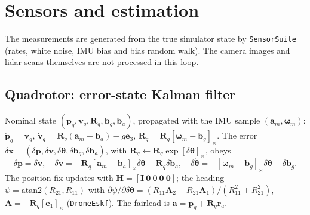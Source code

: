 \documentclass[11pt,a4paper]{article}
\newcommand{\hatm}[1]{[#1]_\times}
\newcommand{\e}{\bm{e}}
\begin{document}
\section{Sensors and estimation}\label{sec:est}
\begin{center}\end{center}
The measurements are generated from the true simulator state by \texttt{SensorSuite} (rates, white noise, IMU
bias and bias random walk). The camera images and lidar scans themselves are not processed in this loop.

\subsection{Quadrotor: error-state Kalman filter}
Nominal state $(\bm p_q,\bm v_q,\bm R_q,\bm b_g,\bm b_a)$, propagated with the IMU sample $(\bm a_m,\bm\omega_m)$:
$\dot{\bm p}_q=\bm v_q$, $\dot{\bm v}_q=\bm R_q(\bm a_m-\bm b_a)-g\e_3$, $\dot{\bm R}_q=\bm R_q\hatm{\bm\omega_m-\bm b_g}$. The error
$\delta\bm x=(\delta\bm p,\delta\bm v,\delta\bm\theta,\delta\bm b_g,\delta\bm b_a)$, with $\bm R_q\leftarrow\bm R_q\exp\hatm{\delta\bm\theta}$, obeys
\begin{equation}
 \delta\dot{\bm p}=\delta\bm v,\quad \delta\dot{\bm v}=-\bm R_q\hatm{\bm a_m-\bm b_a}\delta\bm\theta-\bm R_q\delta\bm b_a,\quad
 \delta\dot{\bm\theta}=-\hatm{\bm\omega_m-\bm b_g}\delta\bm\theta-\delta\bm b_g .
\end{equation}
The position fix updates with $\bm H=[\bm I\ \bm 0\ \bm 0\ \bm 0\ \bm 0]$; the heading
$\psi=\mathrm{atan2}(R_{21},R_{11})$ with $\partial\psi/\partial\delta\bm\theta=(R_{11}\bm A_2-R_{21}\bm A_1)/(R_{11}^2+R_{21}^2)$,
$\bm A=-\bm R_q\hatm{\e_1}$ (\texttt{DroneEskf}). The fairlead is $\bm a=\bm p_q+\bm R_q\bm r_a$.
\end{document}
